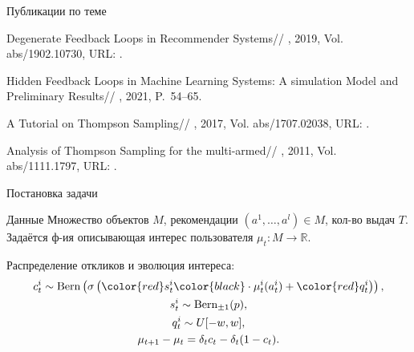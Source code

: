\documentclass{beamer}
\begin{document}
\begin{frame}{Публикации по теме}
\begin{thebibliography}{4}
    Degenerate Feedback Loops in Recommender Systems//
    , 2019, Vol. abs/1902.10730,
	  URL: .

    Hidden Feedback Loops in Machine Learning Systems: A simulation Model and Preliminary Results//
    , 2021, P.~54--65.

    A Tutorial on Thompson Sampling//
    , 2017, Vol. abs/1707.02038,
	  URL: .

    Analysis of Thompson Sampling for the multi-armed//
    , 2011, Vol. abs/1111.1797,
	  URL: .

\end{thebibliography}
\end{frame}
\begin{frame}{Постановка задачи}
  \begin{block}{Данные}
  Множество объектов $M$, рекомендации $(a^1, \dots, a^l) \in M$, кол-во выдач $T$.
  Задаётся ф-ия описывающая интерес пользователя $\mu_t : M \to \mathbb{R}$.

  Распределение откликов и эволюция интереса:
  \begin{gather*}
    c_t^i \sim \text{Bern} \left(\sigma\left( \color{red} s_t^i \color{black} \cdot \mu_t^i (a_t^i) + \mathbin{\color{red} q_t^i } \right) \right), \\ 
    s_t^i \sim \text{Bern}_{\pm 1}(p), \\ q_t^i \sim U[-w, w], \\
\mu_{t+1} - \mu_{t} = \delta_t c_t - \delta_t (1 - c_t). 
  \end{gather*}
  \end{block}
\end{frame}
\end{document}
